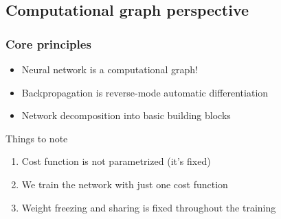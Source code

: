 \documentclass{Bredelebeamer}
\begin{document}
\subsection{Computational graph perspective}
\begin{frame}
	\frametitle{Core principles}
	\begin{itemize}[<+->]
		\item Neural network is a computational graph!
		\item Backpropagation is reverse-mode automatic differentiation
		\item Network decomposition into basic building blocks
	\end{itemize}
	\pause[4]
	\begin{block}{Things to note}
	\begin{enumerate}
		\item Cost function is not parametrized (it's fixed)
		\item We train the network with just one cost function
		\item Weight freezing and sharing is fixed throughout the training
	\end{enumerate}
	\end{block}
\end{frame}
\end{document}
